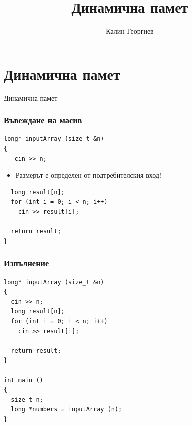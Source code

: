 \documentclass{beamer}
\begin{document}
\title[Обектно ориентирано програмиране]{Динамична памет} 
\author{Калин Георгиев} 
\frame{\titlepage} 

\section{Динамична памет} 


\begin{frame}
\centerline{Динамична памет}
\end{frame}


\begin{frame}[fragile]
\frametitle{Въвеждане на масив}

\begin{flushleft}
\begin{lstlisting}
long* inputArray (size_t &n)
{ 
   cin >> n;
\end{lstlisting}  
\end{flushleft}

\begin{itemize}
  \item Размерът е определен от подтребителския вход!
\end{itemize}

\begin{flushleft}
\begin{lstlisting}
  long result[n];
  for (int i = 0; i < n; i++)
    cin >> result[i];

  return result;
}

\end{lstlisting}  
\end{flushleft}

 

\end{frame}


\begin{frame}[fragile]
\frametitle{Изпълнение}

\begin{flushleft}
\begin{lstlisting}
long* inputArray (size_t &n)
{ 
  cin >> n;
  long result[n];
  for (int i = 0; i < n; i++)
    cin >> result[i];

  return result;
}

int main ()
{
  size_t n;
  long *numbers = inputArray (n);
}

\end{lstlisting}  
\end{flushleft}

 

\end{frame}
\end{document}
